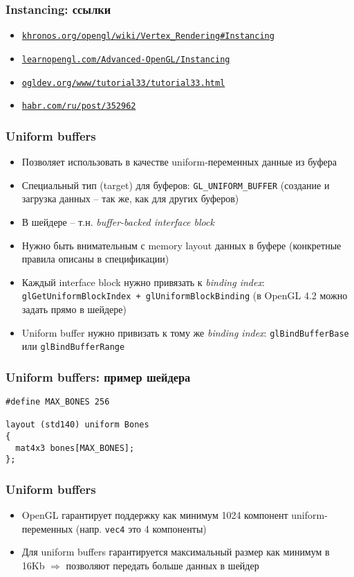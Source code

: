 \documentclass{beamer}
\begin{document}
\begin{frame}[fragile]
\frametitle{Instancing: ссылки}
\begin{itemize}
\item \href{https://www.khronos.org/opengl/wiki/Vertex_Rendering#Instancing}{\nolinkurl{khronos.org/opengl/wiki/Vertex\_Rendering\#Instancing}}
\item \href{https://learnopengl.com/Advanced-OpenGL/Instancing}{\nolinkurl{learnopengl.com/Advanced-OpenGL/Instancing}}
\item \href{https://ogldev.org/www/tutorial33/tutorial33.html}{\nolinkurl{ogldev.org/www/tutorial33/tutorial33.html}}
\item \href{https://habr.com/ru/post/352962}{\nolinkurl{habr.com/ru/post/352962}}
\end{itemize}
\end{frame}

\begin{frame}[fragile]
\frametitle{Uniform buffers}
\begin{itemize}
\item Позволяет использовать в качестве uniform-переменных данные из буфера
\pause
\item Специальный тип (target) для буферов: \verb|GL_UNIFORM_BUFFER| (создание и загрузка данных -- так же, как для других буферов)
\pause
\item В шейдере -- т.н. \textit{buffer-backed interface block}
\pause
\item Нужно быть внимательным с memory layout данных в буфере (конкретные правила описаны в спецификации)
\pause
\item Каждый interface block нужно привязать к \textit{binding index}: \verb|glGetUniformBlockIndex + glUniformBlockBinding| (в OpenGL 4.2 можно задать прямо в шейдере)
\item Uniform buffer нужно привизать к тому же \textit{binding index}: \verb|glBindBufferBase| или \verb|glBindBufferRange|
\end{itemize}
\end{frame}

\begin{frame}[fragile]
\frametitle{Uniform buffers: пример шейдера}
\begin{verbatim}
#define MAX_BONES 256

layout (std140) uniform Bones
{
  mat4x3 bones[MAX_BONES];
};
\end{verbatim}
\end{frame}

\begin{frame}[fragile]
\frametitle{Uniform buffers}
\begin{itemize}
\item OpenGL гарантирует поддержку как минимум 1024 компонент uniform-переменных (напр. \verb|vec4| это 4 компоненты)
\pause
\item Для uniform buffers гарантируется максимальный размер как минимум в 16Kb \begin{math}\Rightarrow\end{math} позволяют передать больше данных в шейдер
\end{itemize}
\end{frame}
\end{document}
